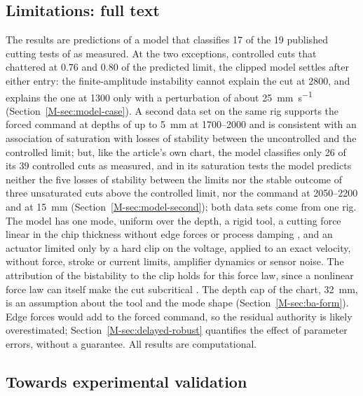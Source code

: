 \subsection{Limitations: full text}\label{supp:std-limitations}

The results are predictions of a model that classifies 17 of the 19 published cutting tests of \citet{ozsoy2026robust} as measured. At the two exceptions, controlled cuts that chattered at 0.76 and 0.80 of the predicted limit, the clipped model settles after either entry: the finite-amplitude instability cannot explain the cut at \SI{2800}{\rpm}, and explains the one at \SI{1300}{\rpm} only with a perturbation of about \SI{25}{\milli\metre\per\second} (Section~\ref{M-sec:model-case}). A second data set on the same rig \citep{ozsoy2025frequency} supports the forced command at depths of up to \SI{5}{\milli\metre} at 1700--\SI{2000}{\rpm} and is consistent with an association of saturation with losses of stability between the uncontrolled and the controlled limit; but, like the article's own chart, the model classifies only 26 of its 39 controlled cuts as measured, and in its saturation tests the model predicts neither the five losses of stability between the limits nor the stable outcome of three unsaturated cuts above the controlled limit, nor the command at 2050--\SI{2200}{\rpm} and at \SI{15}{\milli\metre} (Section~\ref{M-sec:model-second}); both data sets come from one rig. The model has one mode, uniform over the depth, a rigid tool, a cutting force linear in the chip thickness without edge forces or process damping \citep{altintas2012book,budak2010process}, and an actuator limited only by a hard clip on the voltage, applied to an exact velocity, without force, stroke or current limits, amplifier dynamics or sensor noise. The attribution of the bistability to the clip holds for this force law, since a nonlinear force law can itself make the cut subcritical \citep{kalmarnagy2001subcritical,dombovari2008estimates}. The depth cap of the chart, \SI{32}{\milli\metre}, is an assumption about the tool and the mode shape (Section~\ref{M-sec:ba-form}). Edge forces would add to the forced command, so the residual authority is likely overestimated; Section~\ref{M-sec:delayed-robust} quantifies the effect of parameter errors, without a guarantee. All results are computational.

\subsection{Towards experimental validation}\label{supp:std-validation}

